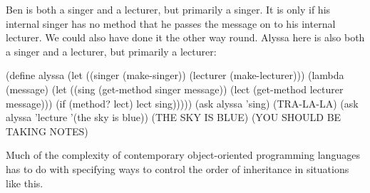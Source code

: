 Ben is both a singer and a lecturer, but primarily a singer.  It is only
if his internal singer has no method that he passes the message on to
his internal lecturer.  We could also have done it the other way round.
Alyssa here is also both a singer and a lecturer, but primarily a lecturer:   

\beginlisp
(define alyssa
  (let ((singer (make-singer))
        (lecturer (make-lecturer)))
    (lambda (message)
      (let ((sing (get-method singer message))
           (lect (get-method lecturer message)))
        (if (method? lect)
            lect
            sing)))))
\null
(ask alyssa 'sing)
(TRA-LA-LA)
\null
(ask alyssa 'lecture '(the sky is blue))
(THE SKY IS BLUE)
(YOU SHOULD BE TAKING NOTES)
\null
\endlisp

Much of the complexity of contemporary object-oriented programming
languages has to do with specifying ways to control the order of
inheritance in situations like this. 


